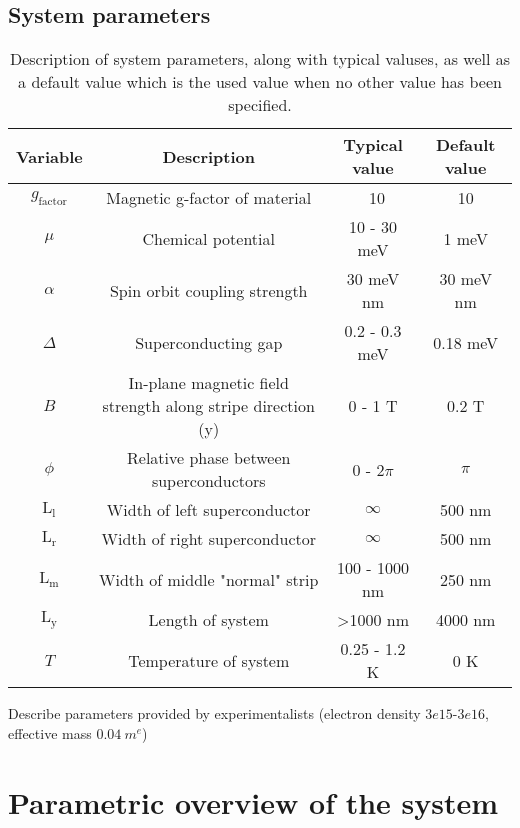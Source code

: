 \documentclass[10pt,a4paper]{article}
\begin{document}
	\subsection{System parameters}
	\begin{table}
		\begin{tabular}{|c|c|c|c|}
			\hline 
			Variable & Description & Typical value & Default value \\ 
			\hline 
			$g_\text{factor}$ & Magnetic g-factor of material & ~10 & 10 \\ 
			\hline 
			$\mu$ & Chemical potential &  10 - 30 meV & 1 meV\\ 
			\hline 
			$\alpha$ & Spin orbit coupling strength &  30 meV nm & 30 meV nm \\ 
			\hline 
			$\Delta$ & Superconducting gap & 0.2 - 0.3 meV & 0.18 meV\\ 
			\hline 
			$B$ & In-plane magnetic field strength along stripe direction (y) & 0 - 1 T & 0.2 T \\ 
			\hline 
			$\phi$ & Relative phase between superconductors &  0 - 2$\pi$ & $\pi$\\ 
			\hline 
			$\text{L}_\text{l}$ & Width of left superconductor & $\infty$ & 500 nm \\
			\hline 
			$\text{L}_\text{r}$ & Width of right superconductor & $\infty$ & 500 nm \\
			\hline
			$\text{L}_\text{m}$ & Width of middle "normal" strip & 100 - 1000 nm & 250 nm \\
			\hline
			$\text{L}_\text{y}$ & Length of system & \textgreater1000 nm & 4000 nm\\
			\hline
			$T$ & Temperature of system & 0.25 - 1.2 K & 0 K\\
			\hline
		\end{tabular} 
	\caption{Description of system parameters, along with typical valuses, as well as a default value which is the used value when no other value has been specified.}
	\label{tbl:system_pars}
	\end{table}
	Describe parameters provided by experimentalists (electron density $3e15$-$3e16$, effective mass $\SI{0.04}{\electronmass}$)
\section{Parametric overview of the system}
\end{document}

